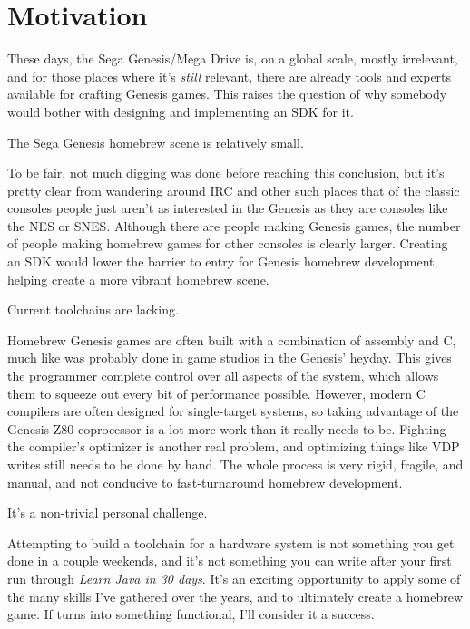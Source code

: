 \chapter{Motivation}

These days, the Sega Genesis/Mega Drive is, on a global scale, mostly
irrelevant, and for those places where it's {\em still} relevant, there
are already tools and experts available for crafting Genesis games. This
raises the question of why somebody would bother with designing and
implementing an SDK for it.

\begin{enumerate}

{\bf \item The Sega Genesis homebrew scene is relatively small.} To
be fair, not much digging was done before reaching this conclusion,
but it's pretty clear from wandering around IRC and other such places
that of the classic consoles people just aren't as interested in the
Genesis as they are consoles like the NES or SNES. Although there are
people making Genesis games, the number of people making homebrew games
for other consoles is clearly larger. Creating an SDK would lower the
barrier to entry for Genesis homebrew development, helping create a more
vibrant homebrew scene.

{\bf \item Current toolchains are lacking.} Homebrew Genesis games
are often built with a combination of assembly and C, much like was
probably done in game studios in the Genesis' heyday. This gives the
programmer complete control over all aspects of the system, which allows
them to squeeze out every bit of performance possible. However, modern
C compilers are often designed for single-target systems, so taking
advantage of the Genesis Z80 coprocessor is a lot more work than it
really needs to be. Fighting the compiler's optimizer is another real
problem, and optimizing things like VDP writes still needs to be done
by hand. The whole process is very rigid, fragile, and manual, and not
conducive to fast-turnaround homebrew development.

{\bf \item It's a non-trivial personal challenge.} Attempting to build
a toolchain for a hardware system is not something you get done in a
couple weekends, and it's not something you can write after your first
run through {\em Learn Java in 30 days}. It's an exciting opportunity
to apply some of the many skills I've gathered over the years, and
to ultimately create a homebrew game. If \gx{} turns into something
functional, I'll consider it a success.

\end{enumerate}
